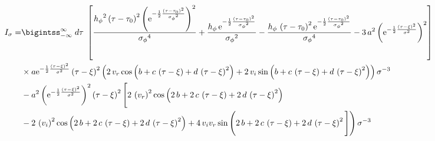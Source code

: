 \begin{align}
I_{\sigma} = & \bigintss_{-\infty}^{\infty} \; d\tau\; \left[ \frac{{{ h_{\phi}}}^{2} \left( \tau-{ \tau_0} \right) ^{2} \left( {
{\rm e}^{-\frac{1}{2}{\frac { \left( \tau-{ \tau_0} \right) ^{2}}{{{ 
\sigma_{\phi}}}^{2}}}}} \right) ^{2}}{{{ \sigma_{\phi}}}^{4}}+\frac{{ h_{\phi}}
\,{{\rm e}^{-\frac{1}{2}{\frac { \left( \tau-{ \tau_0} \right) ^{2}}{{{ 
\sigma_{\phi}}}^{2}}}}}}{{{ \sigma_{\phi}}}^{2}}-\frac{{ h_{\phi}}\, \left( \tau-{
 \tau_0} \right) ^{2}{{\rm e}^{-\frac{1}{2}{\frac { \left( \tau-{ \tau_0}
 \right) ^{2}}{{{ \sigma_{\phi}}}^{2}}}}}}{{{ \sigma_{\phi}}}^{4}}-3\,{a
}^{2} \left( {{\rm e}^{-\frac{1}{2}{\frac { \left( \tau-\xi \right) ^{2}}{
{\sigma}^{2}}}}} \right) ^{2} \right] \nonumber \\
& \times a{{\rm e}^{-\frac{1}{2}{\frac {
 \left( \tau-\xi \right) ^{2}}{{\sigma}^{2}}}}} \left( \tau-\xi
 \right) ^{2} \left( 2\,v_r \cos
 \left( b+c\, \left( \tau-\xi \right) +d\, \left( \tau-\xi
 \right) ^{2} \right) +2\,v_i \sin
 \left( b+c\, \left( \tau-\xi \right) +d\, \left( \tau-\xi
 \right) ^{2} \right)  \right) {\sigma}^{-3} \nonumber \\
 &-{a}^{2} \left( {{\rm e}^{
-\frac{1}{2}{\frac { \left( \tau-\xi \right) ^{2}}{{\sigma}^{2}}}}}
 \right) ^{2} \left( \tau-\xi \right) ^{2} \Bigg[ 2\, \left(v_r \right) ^{2}\cos \left( 2\,b+2\,c\,
 \left( \tau-\xi \right) +2\,d\, \left( \tau-\xi \right) ^{2}
 \right) \nonumber \\
 &-2\, \left( v_i  \right) ^{2}
\cos \left( 2\,b+2\,c\, \left( \tau-\xi \right) +2\,d\, \left( \tau-{
 \xi} \right) ^{2} \right) +4\,v_i v_r \sin \left( 2\,b+2\,c\, \left( \tau-{
 \xi} \right) +2\,d\, \left( \tau-\xi \right) ^{2} \Bigg] 
 \right) {\sigma}^{-3}
\end{align}

